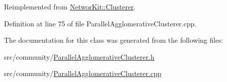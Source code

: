 Reimplemented from \hyperlink{class_networ_kit_1_1_clusterer_ae67135b9fb55c4166ca7d50b720939da}{Networ\-Kit\-::\-Clusterer}.



Definition at line 75 of file Parallel\-Agglomerative\-Clusterer.\-cpp.



The documentation for this class was generated from the following files\-:\begin{DoxyCompactItemize}
\item 
src/community/\hyperlink{_parallel_agglomerative_clusterer_8h}{Parallel\-Agglomerative\-Clusterer.\-h}\item 
src/community/\hyperlink{_parallel_agglomerative_clusterer_8cpp}{Parallel\-Agglomerative\-Clusterer.\-cpp}\end{DoxyCompactItemize}
